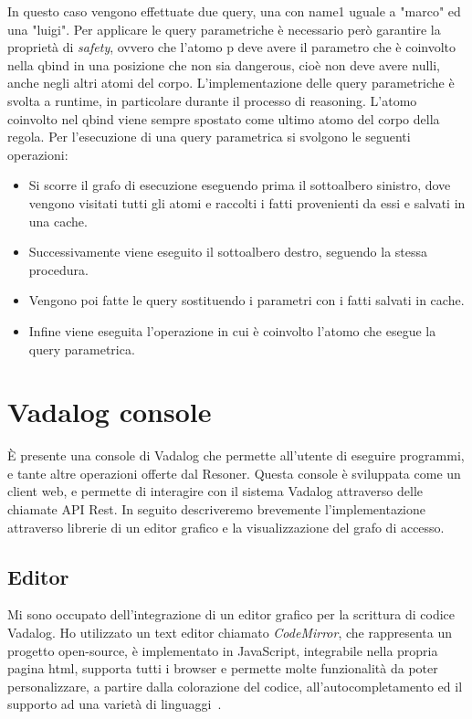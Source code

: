 In questo caso vengono effettuate due query, una con name1 uguale a "marco" ed una "luigi". \newline
Per applicare le query parametriche è necessario però garantire la proprietà di \emph{safety}, ovvero che l'atomo p deve avere il parametro che è coinvolto nella qbind in una posizione che non sia dangerous, cioè non deve avere nulli, anche negli altri atomi del corpo. \newline
L'implementazione delle query parametriche è svolta a runtime, in particolare durante il processo di reasoning. L'atomo coinvolto nel qbind viene sempre spostato come ultimo atomo del corpo della regola. Per l'esecuzione di una query parametrica si svolgono le seguenti operazioni: 
\begin{itemize}
	\item Si scorre il grafo di esecuzione eseguendo prima il sottoalbero sinistro, dove vengono visitati tutti gli atomi e raccolti i fatti provenienti da essi e salvati in una cache.
	\item Successivamente viene eseguito il sottoalbero destro, seguendo la stessa procedura.
	\item Vengono poi fatte le query sostituendo i parametri con i fatti salvati in cache.
	\item Infine viene eseguita l'operazione in cui è coinvolto l'atomo che esegue la query parametrica.
\end{itemize}

\section{Vadalog console}

È presente una console di Vadalog che permette all'utente di eseguire programmi, e tante altre operazioni offerte dal Resoner. \newline
Questa console è sviluppata come un client web, e permette di interagire con il sistema Vadalog attraverso delle chiamate API Rest. \newline
In seguito descriveremo brevemente l'implementazione attraverso librerie di un editor grafico e la visualizzazione del grafo di accesso. 

\subsection{Editor}

Mi sono occupato dell'integrazione di un editor grafico per la scrittura di codice Vadalog. \newline
Ho utilizzato un text editor chiamato \emph{CodeMirror}, che rappresenta un progetto open-source, è implementato in JavaScript, integrabile nella propria pagina html, supporta tutti i browser e permette molte funzionalità da poter personalizzare, a partire dalla colorazione del codice, all'autocompletamento ed il supporto ad una varietà di linguaggi~\cite{CODEMIRROR}.

